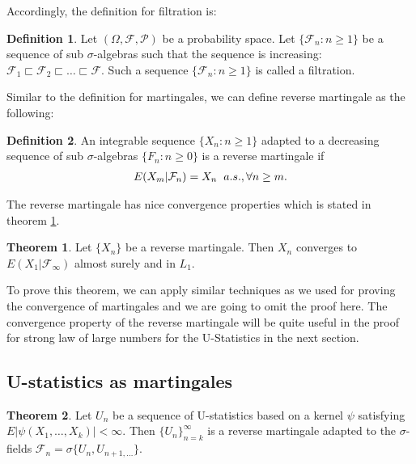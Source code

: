 \documentclass{article}
\theoremstyle{definition}
\newtheorem{theorem}{Theorem}
\newtheorem{Def}{Definition}
\numberwithin{Def}{section}
\begin{document}
Accordingly, the definition for filtration is:
\begin{Def}
Let $(\Omega, \mathcal{F}, \mathcal{P})$ be a probability space. Let $\{\mathcal{F}_n: n\ge1\}$ be a sequence of sub $\sigma$-algebras such that the sequence is increasing: $\mathcal{F}_1 \sqsubset \mathcal{F}_2 \sqsubset \dotsc \sqsubset \mathcal{F}$. Such a sequence $\{\mathcal{F}_n: n\ge1\}$ is called a filtration. 
\end{Def}

Similar to the definition for martingales, we can define reverse martingale as the following:
\begin{Def}
An integrable sequence $\{X_n: n\ge 1\}$ adapted to a decreasing sequence of sub $\sigma$-algebras $\{F_n: n\ge 0\}$ is a reverse martingale if
\begin{align*}
 E(X_m|\mathcal{F}_n)=X_n \hspace{0.2cm} a.s., \forall n\ge m.
\end{align*}
\end{Def}

The reverse martingale has nice convergence properties which is stated in theorem \ref{conv_rm}.
\begin{theorem}\label{conv_rm}
Let $\{X_n\}$ be a reverse martingale. Then $X_n$ converges to $E(X_1|\mathcal{F}_{\infty})$ almost surely and in $L_1$. 
\end{theorem}
To prove this theorem, we can apply similar techniques as we used for proving the convergence of martingales and we are going to omit the proof here. The convergence property of the reverse martingale will be quite useful in the proof for strong law of large numbers for the U-Statistics in the next section.

\subsection{U-statistics as martingales}
\begin{theorem}
Let $U_n$ be a sequence of U-statistics based on a kernel $\psi$ satisfying $E|\psi(X_1, \dotsc, X_k)|<\infty$. Then $\{U_n\}_{n=k}^\infty$ is a reverse martingale adapted to the $\sigma$-fields $\mathcal{F}_n=\sigma\{U_n, U_{n+1,\dotsc}\}$.
\end{theorem}
\end{document}
